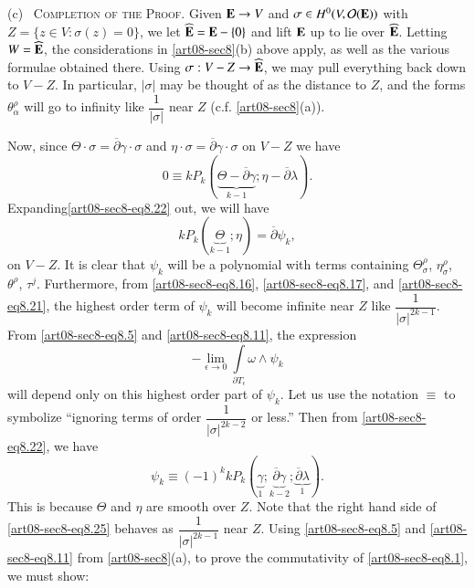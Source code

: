 (c)~ \textsc{Completion of the Proof.} Given $\mathbf{E}\to V$ and $\sigma\in H^{0}(V,\mathcal{O}(\mathbf{E}))$ with $Z=\{z\in V : \sigma(z)=0\}$, we let $\widehat{\mathbf{E}}=\mathbf{E}-\{0\}$ and lift $\mathbf{E}$ up to lie over $\widehat{\mathbf{E}}$. Letting $W=\widehat{\mathbf{E}}$, the considerations in \ref{art08-sec8}(b) above apply, as well as the various formulae obtained there. Using $\sigma:V-Z\to \widehat{\mathbf{E}}$, we may pull everything back down to $V-Z$. In particular, $|\sigma|$ may be thought of as the distance to $Z$, and the forms $\theta^{\rho}_{\alpha}$ will go to infinity like $\dfrac{1}{|\sigma|}$ near $Z$ (c.f. \ref{art08-sec8}(a)).

Now, since $\Theta\cdot \sigma =\overline{\partial}\gamma\cdot \sigma$ and $\eta\cdot \sigma=\overline{\partial}\gamma\cdot \sigma$ on $V-Z$ we have
\begin{equation}
0\equiv kP_{k}(\underbrace{\Theta-\overline{\partial}\gamma}_{k-1};\eta-\overline{\partial}\lambda).\label{art08-sec8-eq8.22}
\end{equation}
Expanding\pageoriginale \eqref{art08-sec8-eq8.22} out, we will have
\begin{equation}
kP_{k}(\underbrace{\Theta}_{k-1}; \eta)=\overline{\partial}\psi_{k},\label{art08-sec8-eq8.23}
\end{equation}
on $V-Z$. It is clear that $\psi_{k}$ will be a polynomial with terms containing $\Theta^{\rho}_{\sigma}$, $\eta^{\rho}_{\sigma}$, $\theta^{\rho}$, $\tau^{j}$. Furthermore, from \eqref{art08-sec8-eq8.16}, \eqref{art08-sec8-eq8.17}, and \eqref{art08-sec8-eq8.21}, the highest order term of $\psi_{k}$ will become infinite near $Z$ like $\dfrac{1}{|\sigma|^{2k-1}}$. From \eqref{art08-sec8-eq8.5} and \eqref{art08-sec8-eq8.11}, the expression
\begin{equation}
-\lim\limits_{\epsilon\to 0}\int\limits_{\partial T_{\epsilon}}\omega\wedge \psi_{k}\label{art08-sec8-eq8.24}
\end{equation}
will depend only on this highest order part of $\psi_{k}$. Let us use the notation $\equiv$ to symbolize ``ignoring terms of order $\dfrac{1}{|\sigma|^{2k-2}}$ or less.'' Then from \eqref{art08-sec8-eq8.22}, we have
\begin{equation}
\psi_{k}\equiv (-1)^{k}kP_{k}(\underbrace{\gamma}_{1}; \underbrace{\overline{\partial}\gamma}_{k-2}; \underbrace{\overline{\partial}\lambda}_{1}).\label{art08-sec8-eq8.25}
\end{equation}
This is because $\Theta$ and $\eta$ are smooth over $Z$. Note that the right hand side of \eqref{art08-sec8-eq8.25} behaves as $\dfrac{1}{|\sigma|^{2k-1}}$ near $Z$. Using \eqref{art08-sec8-eq8.5} and \eqref{art08-sec8-eq8.11} from \ref{art08-sec8}(a), to prove the commutativity of \eqref{art08-sec8-eq8.1}, we must show:
